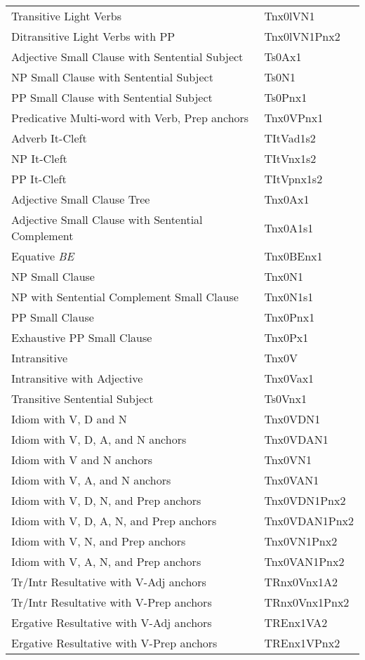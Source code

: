 \begin{tabular}{ll}
Transitive Light Verbs & Tnx0lVN1\\
Ditransitive Light Verbs with PP & Tnx0lVN1Pnx2\\
Adjective Small Clause with Sentential Subject & Ts0Ax1\\
NP Small Clause with Sentential Subject &  Ts0N1\\
PP Small Clause with Sentential Subject & Ts0Pnx1\\
Predicative Multi-word with Verb, Prep anchors & Tnx0VPnx1\\
Adverb It-Cleft & TItVad1s2\\
NP It-Cleft & TItVnx1s2\\
PP It-Cleft & TItVpnx1s2\\
Adjective Small Clause Tree & Tnx0Ax1\\
Adjective Small Clause with Sentential Complement & Tnx0A1s1\\
Equative {\it BE} & Tnx0BEnx1\\
NP Small Clause & Tnx0N1\\
NP with Sentential Complement Small Clause & Tnx0N1s1\\
PP Small Clause & Tnx0Pnx1\\
Exhaustive PP Small Clause & Tnx0Px1\\
Intransitive & Tnx0V\\
Intransitive with Adjective & Tnx0Vax1\\
Transitive Sentential Subject &  Ts0Vnx1\\
Idiom with V, D and N & Tnx0VDN1\\
Idiom with V, D, A, and N anchors & Tnx0VDAN1\\
Idiom with V and N anchors & Tnx0VN1\\
Idiom with V, A, and N anchors & Tnx0VAN1\\
Idiom with V, D, N, and Prep anchors & Tnx0VDN1Pnx2\\
Idiom with V, D, A, N, and Prep anchors & Tnx0VDAN1Pnx2\\
Idiom with V, N, and Prep anchors & Tnx0VN1Pnx2\\
Idiom with V, A, N, and Prep anchors & Tnx0VAN1Pnx2\\
Tr/Intr Resultative with V-Adj anchors & TRnx0Vnx1A2\\
Tr/Intr Resultative with V-Prep anchors & TRnx0Vnx1Pnx2\\
Ergative Resultative with V-Adj anchors & TREnx1VA2\\
Ergative Resultative with V-Prep anchors & TREnx1VPnx2\\
\end{tabular}
\normalsize

\clearpage















